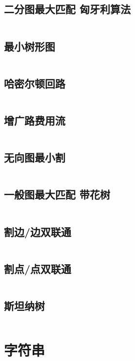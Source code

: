 \documentclass[titlepage,landscape,a4paper,10pt]{article}
\begin{document}
\begin{multicols}{2}
\begin{spacing}{0.8}
\subsection{二分图最大匹配 匈牙利算法}
\inputminted{cpp}{Graph/匈牙利算法.cpp}

\subsection{最小树形图}
\inputminted{cpp}{Graph/朱刘.cpp}

\subsection{哈密尔顿回路}
\inputminted{cpp}{Graph/哈密尔顿回路.cpp}

\subsection{增广路费用流}
\inputminted{cpp}{Graph/增广路费用流.cpp}

\subsection{无向图最小割}
\inputminted{cpp}{Graph/无向图最小割.cpp}

\subsection{一般图最大匹配 带花树}
\inputminted{cpp}{Graph/带花树.cpp}

\subsection{割边/边双联通}
\inputminted{cpp}{Graph/割边.cpp}

\subsection{割点/点双联通}
\inputminted{cpp}{Graph/割点.cpp}

\subsection{斯坦纳树}
\inputminted{cpp}{Graph/斯坦纳树.cpp}

\section{字符串}


\end{spacing}
\end{multicols}
\end{document}
